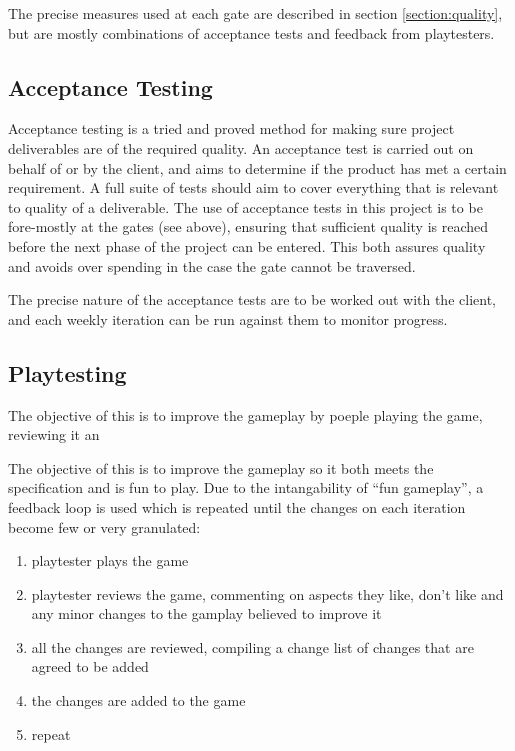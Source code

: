 The precise measures used at each gate are described in section \ref{section:quality}, but are mostly combinations of acceptance tests and feedback from playtesters.

\subsection{Acceptance Testing}

Acceptance testing is a tried and proved method for making sure project deliverables are of the required quality. An acceptance test is carried out on behalf of or by the client, and aims to determine if the product has met a certain requirement. A full suite of tests should aim to cover everything that is relevant to quality of a deliverable. The use of acceptance tests in this project is to be fore-mostly at the gates (see above), ensuring that sufficient quality is reached before the next phase of the project can be entered. This both assures quality and avoids over spending in the case the gate cannot be traversed. 

The precise nature of the acceptance tests are to be worked out with the client, and each weekly iteration can be run against them to monitor progress.

\subsection{Playtesting}


The objective of this is to improve the gameplay by poeple playing the game, reviewing it an

The objective of this is to improve the gameplay so it both meets the specification and is fun to play.
Due to the intangability of ``fun gameplay'', a feedback loop is used which is repeated until the changes on each iteration become few or very granulated:
\begin{enumerate}
\item playtester plays the game
\item playtester reviews the game, commenting on aspects they like, don't like and any minor changes to the gamplay believed to improve it
\item all the changes are reviewed, compiling a change list of changes that are agreed to be added
\item the changes are added to the game
\item repeat
\end{enumerate}

